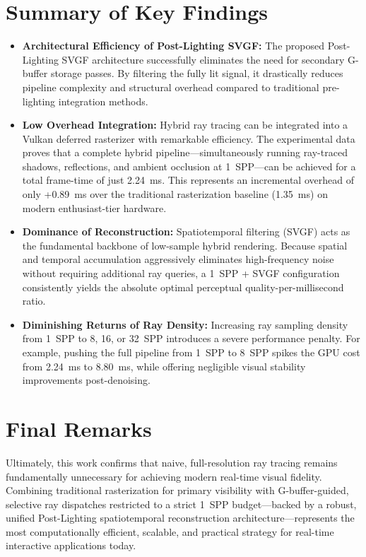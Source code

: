 \documentclass[12pt,a4paper]{report}
\begin{document}
\section{Summary of Key Findings}

\begin{itemize}
    \item \textbf{Architectural Efficiency of Post-Lighting SVGF:} The proposed Post-Lighting SVGF architecture successfully eliminates the need for secondary G-buffer storage passes. By filtering the fully lit signal,
     it drastically reduces pipeline complexity and structural overhead compared to traditional pre-lighting integration methods.
    
    \item \textbf{Low Overhead Integration:} Hybrid ray tracing can be integrated into a Vulkan deferred rasterizer with remarkable efficiency.
     The experimental data proves that a complete hybrid pipeline---simultaneously running ray-traced shadows, reflections, and ambient occlusion at 1~SPP---can be achieved for a total frame-time of just 2.24~ms.
      This represents an incremental overhead of only +0.89~ms over the traditional rasterization baseline (1.35~ms) on modern enthusiast-tier hardware.
    
    \item \textbf{Dominance of Reconstruction:} Spatiotemporal filtering (SVGF) acts as the fundamental backbone of low-sample hybrid rendering.
     Because spatial and temporal accumulation aggressively eliminates high-frequency noise without requiring additional ray queries, a 1~SPP + SVGF configuration consistently yields the absolute optimal perceptual quality-per-millisecond ratio.
    
    \item \textbf{Diminishing Returns of Ray Density:} Increasing ray sampling density from 1~SPP to 8, 16, or 32~SPP introduces a severe performance penalty.
     For example, pushing the full pipeline from 1~SPP to 8~SPP spikes the GPU cost from 2.24~ms to 8.80~ms, while offering negligible visual stability improvements post-denoising.
\end{itemize}

\section{Final Remarks}

Ultimately, this work confirms that naive, full-resolution ray tracing remains fundamentally unnecessary for achieving modern real-time visual fidelity.
Combining traditional rasterization for primary visibility with G-buffer-guided, selective ray dispatches restricted to a strict 1~SPP budget---backed by a robust,
unified Post-Lighting spatiotemporal reconstruction architecture---represents the most computationally efficient, scalable, and practical strategy for real-time interactive applications today.
\end{document}
